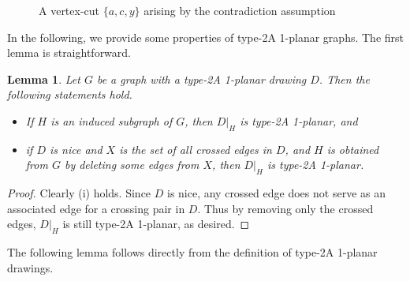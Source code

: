 \documentclass[12pt,a4paper]{article}
\newtheorem{lem}{Lemma}[section]
\begin{document}
\begin{figure}[H]
\centering
{}

\caption{A vertex-cut $\{a,c,y\}$  arising by the contradiction assumption}
\label{fig:nice}
\end{figure}



In the following, we provide some  properties of type-2A 1-planar graphs. The first lemma is straightforward.



\begin{lem}\label{lem:delete1_planar}
Let $G$ be a  graph with a type-2A 1-planar drawing $D$.  Then the following statements hold. 
\begin{itemize}
  \item[(i)]If $H$ is an induced subgraph of $G$, then $D|_H$ is  type-2A 1-planar, and
  \item[(ii)]if $D$ is nice and $X$ is the set of all crossed edges in $D$, and   
$H$ is obtained from $G$ by deleting some edges from $X$, then $D|_H$ is  type-2A 1-planar.
\end{itemize}

\end{lem}
\begin{proof}
 Clearly (i) holds. Since $D$ is nice, any crossed edge does not serve as an associated edge for a crossing pair in $D$. Thus by removing only the crossed edges, $D|_H$ is still  type-2A 1-planar, as desired.
\end{proof}

 

The following lemma follows directly from the definition of type-2A 1-planar drawings.
\end{document}
